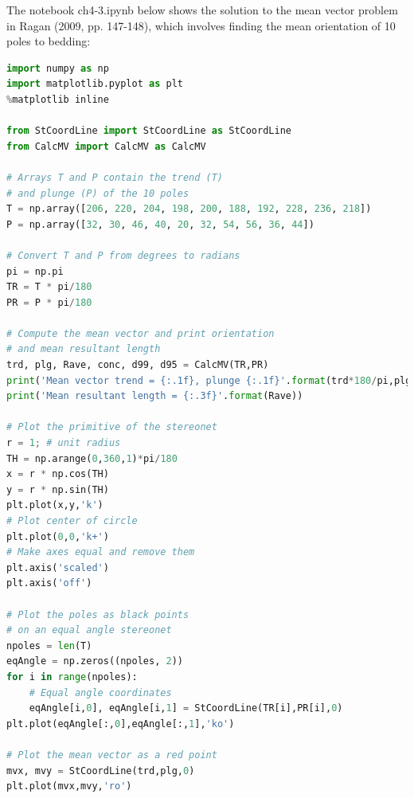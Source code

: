 \documentclass[a4paper , 12pt]{book}
\begin{document}
The notebook ch4-3.ipynb below shows the solution to the mean vector problem in Ragan (2009, pp. 147-148), which involves finding the mean orientation of 10 poles to bedding:

\begin{center}
\begin{lstlisting}[language=Python, frame=single]
import numpy as np
import matplotlib.pyplot as plt
%matplotlib inline

from StCoordLine import StCoordLine as StCoordLine
from CalcMV import CalcMV as CalcMV 

# Arrays T and P contain the trend (T) 
# and plunge (P) of the 10 poles
T = np.array([206, 220, 204, 198, 200, 188, 192, 228, 236, 218])
P = np.array([32, 30, 46, 40, 20, 32, 54, 56, 36, 44])

# Convert T and P from degrees to radians
pi = np.pi
TR = T * pi/180
PR = P * pi/180

# Compute the mean vector and print orientation
# and mean resultant length
trd, plg, Rave, conc, d99, d95 = CalcMV(TR,PR)
print('Mean vector trend = {:.1f}, plunge {:.1f}'.format(trd*180/pi,plg*180/pi))
print('Mean resultant length = {:.3f}'.format(Rave))

# Plot the primitive of the stereonet
r = 1; # unit radius
TH = np.arange(0,360,1)*pi/180
x = r * np.cos(TH)
y = r * np.sin(TH)
plt.plot(x,y,'k')
# Plot center of circle
plt.plot(0,0,'k+')
# Make axes equal and remove them
plt.axis('scaled')
plt.axis('off')

# Plot the poles as black points
# on an equal angle stereonet
npoles = len(T)
eqAngle = np.zeros((npoles, 2))
for i in range(npoles):
    # Equal angle coordinates
    eqAngle[i,0], eqAngle[i,1] = StCoordLine(TR[i],PR[i],0)
plt.plot(eqAngle[:,0],eqAngle[:,1],'ko')

# Plot the mean vector as a red point
mvx, mvy = StCoordLine(trd,plg,0)
plt.plot(mvx,mvy,'ro')
\end{lstlisting}
\end{center}
\end{document}

